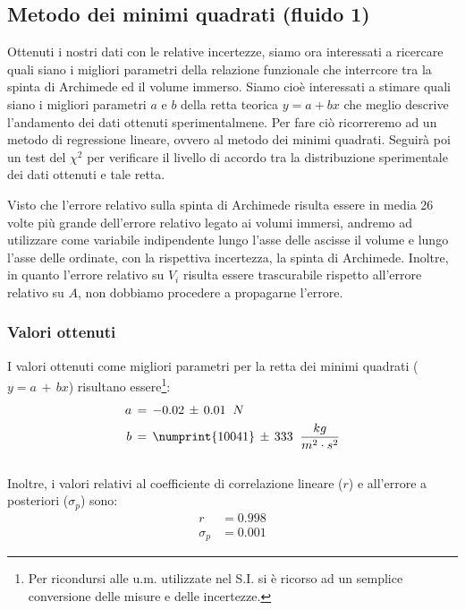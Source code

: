 \documentclass{article}
\begin{document}
\subsection{Metodo dei minimi quadrati (fluido 1)}
Ottenuti i nostri dati con le relative incertezze, siamo ora interessati a ricercare quali siano i migliori parametri della relazione funzionale che interrcore tra la spinta di Archimede ed il volume immerso. Siamo cioè interessati a stimare quali siano i migliori parametri $a$ e $b$ della retta teorica $y = a +bx$ che meglio descrive l'andamento dei dati ottenuti sperimentalmene.
Per fare ciò ricorreremo ad un metodo di regressione lineare, ovvero al metodo dei minimi quadrati. Seguirà poi un test del $\chi^2$ per verificare il livello di accordo tra la distribuzione sperimentale dei dati ottenuti e tale retta. \medskip 

Visto che l'errore relativo sulla spinta di Archimede risulta essere in media 26 volte più grande dell'errore relativo legato ai volumi immersi, andremo ad utilizzare come variabile indipendente lungo l'asse delle ascisse il volume e lungo l'asse delle ordinate, con la rispettiva incertezza, la spinta di Archimede. Inoltre, in quanto l'errore relativo su $V_i$ risulta essere trascurabile rispetto all'errore relativo su $A$, non dobbiamo procedere a propagarne l'errore.
\subsubsection{Valori ottenuti}
I valori ottenuti come migliori parametri per la retta dei minimi quadrati ($y=a\,+\,bx$) risultano essere\footnote{Per ricondursi alle u.m. utilizzate nel S.I. si è ricorso ad un semplice conversione delle misure e delle incertezze.}:
\begin{align*}
    a \,&= \,-0.02 \,\pm\, 0.01\;\;N\\
    b \,&= \,\numprint{10041} \,\pm\, 333\;\;\frac{kg}{m^2\cdot s^2}
\end{align*}
\\Inoltre, i valori relativi al coefficiente di correlazione lineare ($r$) e all'errore a posteriori ($\sigma_p$) sono:
\begin{align*}
    r &= 0.998 \\
    \sigma_{p} &= 0.001
\end{align*}
\end{document}
